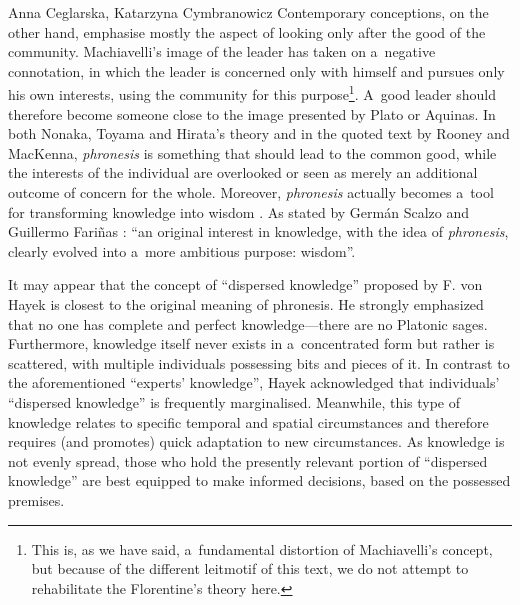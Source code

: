\begin{artengenv2auth}{Anna Ceglarska, Katarzyna Cymbranowicz}
Contemporary conceptions, on the other hand, emphasise mostly the aspect of looking only after the good of the community. Machiavelli's image of the leader has taken on a~negative connotation, in which the leader is concerned only with himself and pursues only his own interests, using the community for this purpose\footnote{This is, as we have said, a~fundamental distortion of Machiavelli's concept, but because of the different leitmotif of this text, we do not attempt to rehabilitate the Florentine's theory here.}. A~good leader should therefore become someone close to the image presented by Plato or Aquinas. In both Nonaka, Toyama and Hirata's theory and in the quoted text by Rooney and MacKenna, \textit{phronesis} is something that should lead to the common good, while the interests of the individual are overlooked or seen as merely an additional outcome of concern for the whole. Moreover, \textit{phronesis} actually becomes a~tool for transforming knowledge into wisdom 
\parencite[][p.67]{nonaka_managing_2008}. %
 As stated by Germán Scalzo and Guillermo Fariñas 
\parencite*[][p.30]{scalzo_aristotelian_2018}: %
 ``an original interest in knowledge, with the idea of \textit{phronesis}, clearly evolved into a~more ambitious purpose: wisdom''.



It may appear that the concept of ``dispersed knowledge'' proposed by F. von Hayek 
\parencite*[][]{hayek_use_1945} %
 is closest to the original meaning of phronesis. He strongly emphasized that no one has complete and perfect knowledge---there are no Platonic sages. Furthermore, knowledge itself never exists in a~concentrated form but rather is scattered, with multiple individuals possessing bits and pieces of it. In contrast to the aforementioned ``experts' knowledge'', Hayek acknowledged that individuals' ``dispersed knowledge'' is frequently marginalised. Meanwhile, this type of knowledge relates to specific temporal and spatial circumstances and therefore requires (and promotes) quick adaptation to new circumstances. As knowledge is not evenly spread, those who hold the presently relevant portion of ``dispersed knowledge'' are best equipped to make informed decisions, based on the possessed premises.




\end{artengenv2auth}

